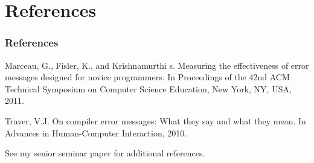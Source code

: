 \documentclass{beamer}
\newcommand{\linespace}{\vskip 0.25cm}
\begin{document}
\section*{References}

\begin{frame} 
	\frametitle{References} 
	
	\begin{thebibliography}{lskdjf}
	
Marceau, G., Fisler, K., and Krishnamurthi s.
\newblock Measuring the effectiveness of error messages designed for novice programmers.
\newblock In Proceedings of the 42nd ACM Technical Symposium on Computer Science Education, New York, NY, USA, 2011.
	
	Traver, V.J.
\newblock On compiler error messages: What they say and what they mean.
\newblock In Advances in Human-Computer Interaction, 2010.
  
  	\end{thebibliography}
	
	\linespace
	\begin{center}
	See my senior seminar paper for additional references.
	\end{center}
\end{frame} 
\end{document}
